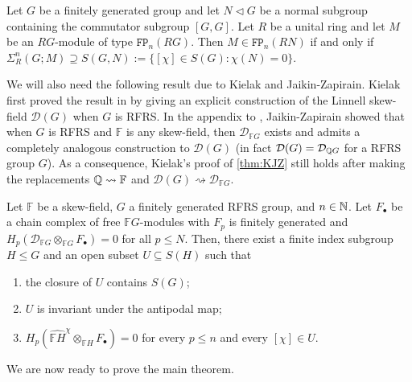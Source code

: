 \documentclass[11pt, letterpaper]{amsart}
\begin{document}
\begin{thm}\label{thm:genBR}
Let $G$ be a finitely generated group and let $N \triangleleft G$ be a normal subgroup containing the commutator subgroup $[G,G]$. Let $R$ be a unital ring and let $M$ be an $RG$-module of type $\mathtt{FP}_n(RG)$. Then $M \in \mathtt{FP}_n(RN)$ if and only if $\Sigma_R^n(G;M) \supseteq S(G,N) := \{ [\chi] \in S(G) : \chi(N) = 0 \}$.
\end{thm}

We will also need the following result due to Kielak and Jaikin-Zapirain. Kielak first proved the result in \cite[Theorem 5.2]{KielakRFRS} by giving an explicit construction of the Linnell skew-field $\mathcal D(G)$ when $G$ is RFRS. In the appendix to \cite{JaikinZapirain2020THEUO}, Jaikin-Zapirain showed that when $G$ is RFRS and $\mathbb F$ is any skew-field, then $\mathcal D_{\mathbb F G}$ exists and admits a completely analogous construction to $\mathcal D(G)$ (in fact $\mathcal D(G) = \mathcal D_{\mathbb{Q} G}$ for a RFRS group $G$). As a consequence, Kielak's proof of \cref{thm:KJZ} still holds after making the replacements $\mathbb{Q} \rightsquigarrow \mathbb F$ and $\mathcal D(G) \rightsquigarrow \mathcal D_{\mathbb FG}$.

\begin{thm} \label{thm:KJZ}
Let $\mathbb F$ be a skew-field, $G$ a finitely generated RFRS group, and $n \in \mathbb{N}$. Let $F_\bullet$ be a chain complex of free $\mathbb F G$-modules with $F_p$ is finitely generated and $H_p(\mathcal D_{\mathbb F G} \otimes_{\mathbb F G} F_\bullet) = 0$ for all $p \leqslant N$. Then, there exist a finite index subgroup $H \leqslant G$ and an open subset $U \subseteq S(H)$ such that
\begin{enumerate}
    \item the closure of $U$ contains $S(G)$;
    \item $U$ is invariant under the antipodal map;
    \item $H_p(\widehat{\mathbb F H}^\chi \otimes_{\mathbb F H} F_\bullet) = 0$ for every $p \leqslant n$ and every $[\chi] \in U$.
\end{enumerate}
\end{thm}

We are now ready to prove the main theorem.
\end{document}
